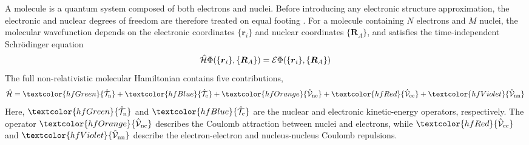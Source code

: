 \documentclass[11pt,a4paper,titlepage]{article}
\numberwithin{equation}{section}
\newcommand{\br}{\boldsymbol{r}}
\newcommand{\bR}{\boldsymbol{R}}
\newcommand{\chH}{\Hat{\mathcal{H}}}
\newcommand{\chT}{\Hat{\mathcal{T}}}
\newcommand{\chV}{\Hat{\mathcal{V}}}
\newcommand{\cE}{\mathcal{E}}
\newcommand{\red}[1]{\textcolor{hfRed}{#1}}
\newcommand{\orange}[1]{\textcolor{hfOrange}{#1}}
\newcommand{\green}[1]{\textcolor{hfGreen}{#1}}
\newcommand{\blue}[1]{\textcolor{hfBlue}{#1}}
\newcommand{\violet}[1]{\textcolor{hfViolet}{#1}}
\begin{document}
A molecule is a quantum system composed of both electrons and nuclei. Before
introducing any electronic structure approximation, the electronic and nuclear
degrees of freedom are therefore treated on equal footing
\citep{BornOppenheimer1927}. For a molecule
containing $N$ electrons and $M$ nuclei, the molecular wavefunction depends on
the electronic coordinates $\{\br_i\}$ and nuclear coordinates $\{\bR_A\}$,
and satisfies the time-independent Schr\"odinger equation
\begin{equation}
  \chH
  \Phi(\{\br_i\},\{\bR_A\})
  =
  \cE
  \Phi(\{\br_i\},\{\bR_A\})
\end{equation}
The full non-relativistic molecular Hamiltonian contains five contributions,
\begin{equation}
  \chH
  =
  \green{\chT_\text{n}}
  +
  \blue{\chT_\text{e}}
  +
  \orange{\chV_\text{ne}}
  +
  \red{\chV_\text{ee}}
  +
  \violet{\chV_\text{nn}}
  \label{eq:total-hamiltonian}
\end{equation}
Here, $\green{\chT_\text{n}}$ and $\blue{\chT_\text{e}}$ are the nuclear
and electronic kinetic-energy operators, respectively.
The operator $\orange{\chV_\text{ne}}$ describes the Coulomb attraction
between nuclei and electrons, while $\red{\chV_\text{ee}}$ and
$\violet{\chV_\text{nn}}$ describe the electron-electron and
nucleus-nucleus Coulomb repulsions.
\end{document}
